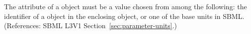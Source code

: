 The  attribute of a \Parameter object must be a value chosen
from among the following: the identifier of a \UnitDefinition object in the
enclosing \Model object, or one of the base units in SBML.  (References:
SBML L3V1 Section~\ref{sec:parameter-units}.)
